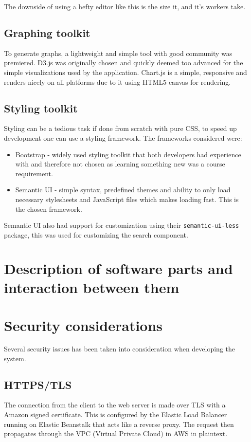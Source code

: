 \documentclass[12pt,a4paper]{report}
\begin{document}
The downside of using a hefty editor like this is the size it, and it's workers take.

\section{Graphing toolkit}
To generate graphs, a lightweight and simple tool with good community was premiered. D3.js was originally chosen and quickly deemed too advanced for the simple visualizations used by the application. Chart.js is a simple, responsive and renders nicely on all platforms due to it using HTML5 canvas for rendering.

\section{Styling toolkit}
Styling can be a tedious task if done from scratch with pure CSS, to speed up development one can use a styling framework.
The frameworks considered were:

\begin{itemize}
    \item Bootstrap - widely used styling toolkit that both developers had experience with and therefore not chosen as learning something new was a course requirement.
    \item Semantic UI - simple syntax, predefined themes and ability to only load necessary stylesheets and JavaScript files which makes loading fast. This is the chosen framework.
\end{itemize}

Semantic UI also had support for customization using their \texttt{semantic-ui-less} package, this was used for customizing the search component.

\chapter{Description of software parts and interaction between them}

\newpage

\chapter{Security considerations}
Several security issues has been taken into consideration when developing the system.

\section{HTTPS/TLS}
The connection from the client to the web server is made over TLS with a Amazon signed certificate.
This is configured by the Elastic Load Balancer running on Elastic Beanstalk that acts like a reverse proxy.
The request then propagates through the VPC (Virtual Private Cloud) in AWS in plaintext. 
\end{document}
